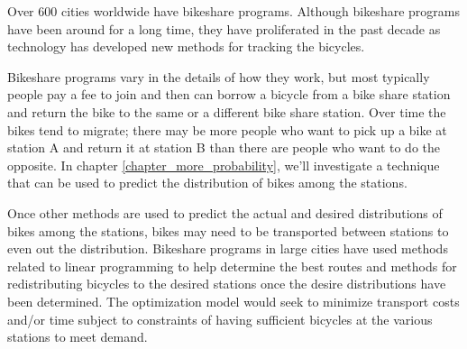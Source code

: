 Over 600 cities worldwide have bikeshare programs. Although bikeshare programs have been around for a long time, they have proliferated in the past decade as technology has developed new methods for tracking the bicycles.

Bikeshare programs vary in the details of how they work, but most typically people pay a fee to join and then can borrow a bicycle from a bike share station and return the bike to the same or a different bike share station. Over time the bikes tend to migrate; there may be more people who want to pick up a bike at station A and return it at station B than there are people who want to do the opposite. In chapter \ref{chapter_more_probability}, we'll investigate a technique that can be used to predict the distribution of bikes among the stations.

Once other methods are used to predict the actual and desired distributions of bikes among the stations, bikes may need to be transported between stations to even out the distribution. Bikeshare programs in large cities have used methods related to linear programming to help determine the best routes and methods for redistributing bicycles to the desired stations once the desire distributions have been determined. The optimization model would seek to minimize transport costs and/or time subject to constraints of having sufficient bicycles at the various stations to meet demand.
